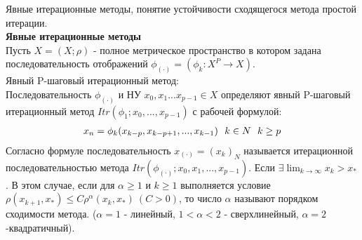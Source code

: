 \documentclass[__main__.tex]{subfiles}
\begin{document}
Явные итерационные методы, понятие устойчивости сходящегося метода простой итерации.\\

\textbf{Явные итерационные методы}\\

Пусть $X = (X;\rho)$ - полное метрическое пространство в котором задана последовательность отображений $\phi_{(\cdot)} = (\phi_k:X^P \to X)$.\\
Явный P-шаговый итерационный метод:\\
Последовательность $\phi_{(\cdot)}$ и НУ $x_0,x_1...x_{p-1} \in X$ определяют явный P-шаговый итерационный метод $Itr(\phi_1;x_0,...,x_{p-1})$ с рабочей формулой:\\
\begin{gather}
\llabel{11:1}
x_n = \phi_k(x_{k-p},x_{k-p+1},...,x_{k-1}) \ \ k \in N \ \ k\geq p
\end{gather}
Согласно формуле  последовательность $x_{(\cdot)} = (x_k)_N$ называется итерационной последовательностью метода $Itr(\phi_{(\cdot)};x_0,x_1,...,x_{p-1})$. Если $\exists \lim_{k \to \infty} x_k > x_*$. В этом случае, если для $\alpha \geq 1$ и $k \geq 1$ выполняется условие $\rho(x_{k+1},x_*) \leq C \rho^\alpha (x_k,x_*) \ (C>0)$, то число $\alpha$ называют порядком сходимости метода. ($\alpha = 1$ - линейный, $1<\alpha<2$ - сверхлинейный, $\alpha = 2$ -квадратичный).
\end{document}
